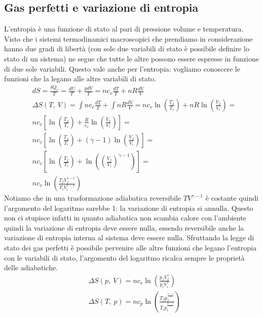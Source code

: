 \documentclass[
10pt, %
a4paper, %
oneside, %
headinclude,footinclude, %
BCOR5mm, %
]{scrartcl}
\begin{document}
\subsection{Gas perfetti e variazione di entropia}
L'entropia è una funzione di stato al pari di pressione volume e temperatura. Visto che i sistemi termodinamici macroscopici che prendiamo in considerazione hanno due gradi di libertà (con sole due variabili di stato è possibile definire lo stato di un sistema) ne segue che tutte le altre possono essere espresse in funzione di due sole variabili. Questo vale anche per l'entropia: vogliamo conoscere le funzioni che la legano alle altre variabili di stato. 
\begin{align*}
	&dS = \frac{\delta Q_r}{T} = \frac{dU}{T} + \frac{pdV}{T} = n c_v \frac{dT}{T}+nR\frac{dV}{V}\\
	&\Delta S(T,\ V) = \int n c_v \frac{dT}{T}+\int nR\frac{dV}{V} = nc_v\ln\left(\frac{T_f}{T_i}\right)+ nR\ln\left(\frac{V_f}{V_i}\right)=\\
	&nc_v\left[\ln\left(\frac{T_f}{T_i}\right)+\frac{R}{c_v}\ln\left(\frac{V_f}{V_i}\right)\right]=\\
	&nc_v\left[\ln\left(\frac{T_f}{T_i}\right)+(\gamma-1)\ln\left(\frac{V_f}{V_i}\right)\right]=\\
	&nc_v\left[\ln\left(\frac{T_f}{T_i}\right)+\ln\left(\left(\frac{V_f}{V_i}\right)^{\gamma-1}\right)\right]=\\
	&nc_v\ln\left(\frac{T_fV_f^{\gamma-1}}{T_iV_i^{\gamma-1}}\right)
\end{align*}
Notiamo che in una trasformazione adiabatica reversibile \(TV^{\gamma-1}\) è costante quindi l'argomento del logaritmo sarebbe 1: la variazione di entropia si annulla. Questo non ci stupisce infatti in quanto adiabatica non scambia calore con l'ambiente quindi la variazione di entropia deve essere nulla, essendo reversibile anche la variazione di entropia interna al sistema deve essere nulla. Sfruttando la legge di stato dei gas perfetti è possibile pervenire alle altre funzioni che legano l'entropia con le variabili di stato, l'argomento del logaritmo ricalca sempre le proprietà delle adiabatiche.
\begin{align*}
	&\Delta S(p,\ V)=nc_v\ln\left(\frac{p_fV_f^{\gamma}}{p_iV_i^{\gamma}}\right)\\
	&\Delta S(T,\ p)=nc_p\ln\left(\frac{T_fp_f^{\frac{1-\gamma}{\gamma}}}{T_ip_i^{\frac{1-\gamma}{\gamma}}}\right)
\end{align*}
\end{document}
